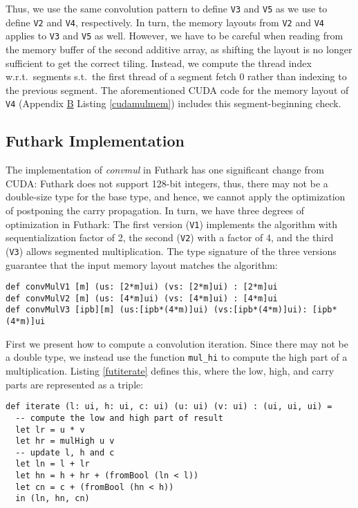 Thus, we use the same convolution pattern to define \texttt{V3} and \texttt{V5}
as we use to define \texttt{V2} and \texttt{V4}, respectively. In turn, the
memory layouts from \texttt{V2} and \texttt{V4} applies to \texttt{V3} and
\texttt{V5} as well. However, we have to be careful when reading from the memory
buffer of the second additive array, as shifting the layout is no longer
sufficient to get the correct tiling. Instead, we compute the thread index
w.r.t.\ segments s.t.\ the first thread of a segment fetch $0$ rather than
indexing to the previous segment. The aforementioned CUDA code for the memory
layout of \texttt{V4} (Appendix \hyperref[app:B]{B} Listing \ref{cudamulmem})
includes this segment-beginning check.

\subsection{Futhark Implementation}
\label{subsec:mulfut}

The implementation of \textit{convmul} in Futhark has one significant change
from CUDA: Futhark does not support 128-bit integers, thus, there may not be a
double-size type for the base type, and hence, we cannot apply the optimization
of postponing the carry propagation. In turn, we have three degrees of
optimization in Futhark: The first version (\texttt{V1}) implements the
algorithm with sequentialization factor of 2, the second (\texttt{V2}) with a
factor of 4, and the third (\texttt{V3}) allows segmented multiplication.  The
type signature of the three versions guarantee that the input memory layout
matches the algorithm:
\begin{lstlisting}[language=futhark,frame=none,numbers=none]
def convMulV1 [m] (us: [2*m]ui) (vs: [2*m]ui) : [2*m]ui
def convMulV2 [m] (us: [4*m]ui) (vs: [4*m]ui) : [4*m]ui
def convMulV3 [ipb][m] (us:[ipb*(4*m)]ui) (vs:[ipb*(4*m)]ui): [ipb*(4*m)]ui
\end{lstlisting}

First we present how to compute a convolution iteration. Since there may not be
a double type, we instead use the function \texttt{mul\_hi} to compute the high
part of a multiplication. Listing \ref{futiterate} defines this, where the low,
high, and carry parts are represented as a triple:
\begin{lstlisting}[language=futhark,caption={\footnotesize Futhark function to compute a convolution iteration from file \texttt{mul.fut}.},label={futiterate},firstnumber=16]
def iterate (l: ui, h: ui, c: ui) (u: ui) (v: ui) : (ui, ui, ui) =
  -- compute the low and high part of result
  let lr = u * v
  let hr = mulHigh u v
  -- update l, h and c
  let ln = l + lr
  let hn = h + hr + (fromBool (ln < l))
  let cn = c + (fromBool (hn < h))
  in (ln, hn, cn)
\end{lstlisting}


